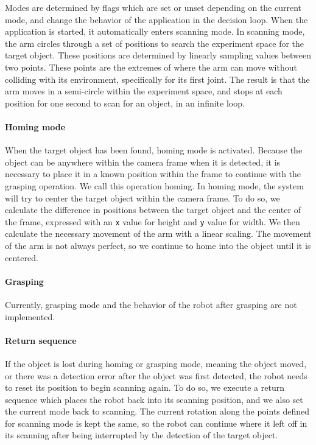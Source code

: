 Modes are determined by flags which are set or unset depending on the current mode, and change the behavior of the application in the decision loop. When the application is started, it automatically enters scanning mode. In scanning mode, the arm circles through a set of positions to search the experiment space for the target object. These positions are determined by linearly sampling values between two points. These points are the extremes of where the arm can move without colliding with its environment, specifically for its first joint. The result is that the arm moves in a semi-circle within the experiment space, and stops at each position for one second to scan for an object, in an infinite loop.

\paragraph{Homing mode}

When the target object has been found, homing mode is activated. Because the object can be anywhere within the camera frame when it is detected, it is necessary to place it in a known position within the frame to continue with the grasping operation. We call this operation homing. In homing mode, the system will try to center the target object within the camera frame. To do so, we calculate the difference in positions between the target object and the center of the frame, expressed with an \lstinline{x} value for height and \lstinline{y} value for width. We then calculate the necessary movement of the arm with a linear scaling. The movement of the arm is not always perfect, so we continue to home into the object until it is centered.

\paragraph{Grasping}

Currently, grasping mode and the behavior of the robot after grasping are not implemented.


\paragraph{Return sequence}

If the object is lost during homing or grasping mode, meaning the object moved, or there was a detection error after the object was first detected, the robot needs to reset its position to begin scanning again. To do so, we execute a return sequence which places the robot back into its scanning position, and we also set the current mode back to scanning. The current rotation along the points defined for scanning mode is kept the same, so the robot can continue where it left off in its scanning after being interrupted by the detection of the target object.

